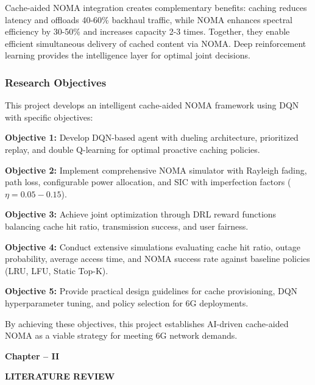 \documentclass[12pt,a4paper]{article}
\begin{document}
Cache-aided NOMA integration creates complementary benefits: caching reduces latency and offloads 40-60\% backhaul traffic, while NOMA enhances spectral efficiency by 30-50\% and increases capacity 2-3 times. Together, they enable efficient simultaneous delivery of cached content via NOMA. Deep reinforcement learning provides the intelligence layer for optimal joint decisions.

\subsubsection{Research Objectives}

This project develops an intelligent cache-aided NOMA framework using DQN with specific objectives:

\textbf{Objective 1:} Develop DQN-based agent with dueling architecture, prioritized replay, and double Q-learning for optimal proactive caching policies.

\textbf{Objective 2:} Implement comprehensive NOMA simulator with Rayleigh fading, path loss, configurable power allocation, and SIC with imperfection factors ($\eta = 0.05-0.15$).

\textbf{Objective 3:} Achieve joint optimization through DRL reward functions balancing cache hit ratio, transmission success, and user fairness.

\textbf{Objective 4:} Conduct extensive simulations evaluating cache hit ratio, outage probability, average access time, and NOMA success rate against baseline policies (LRU, LFU, Static Top-K).

\textbf{Objective 5:} Provide practical design guidelines for cache provisioning, DQN hyperparameter tuning, and policy selection for 6G deployments.

By achieving these objectives, this project establishes AI-driven cache-aided NOMA as a viable strategy for meeting 6G network demands.

\thispagestyle{plain}


\clearpage

\begin{center}
    \vspace*{10cm}
    
    {\fontsize{16}{19.2}\selectfont\bfseries
    Chapter -- II}
    
    \vspace{1cm}
    
    {\fontsize{16}{19.2}\selectfont\bfseries
    LITERATURE REVIEW}
    
    \vspace*{\fill}
\end{center}
\end{document}
